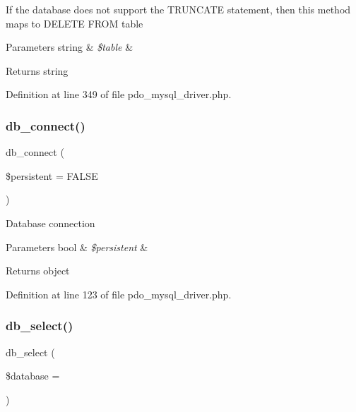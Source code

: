If the database does not support the T\+R\+U\+N\+C\+A\+TE statement, then this method maps to \textquotesingle{}D\+E\+L\+E\+TE F\+R\+OM table\textquotesingle{}


\begin{DoxyParams}[1]{Parameters}
string & {\em \$table} & \\
\hline
\end{DoxyParams}
\begin{DoxyReturn}{Returns}
string 
\end{DoxyReturn}


Definition at line 349 of file pdo\+\_\+mysql\+\_\+driver.\+php.

\mbox{\label{class_c_i___d_b__pdo__mysql__driver_a52bf595e79e96cc0a7c907a9b45aeb4d}} 
\subsubsection{\texorpdfstring{db\_connect()}{db\_connect()}}
{\footnotesize\ttfamily db\+\_\+connect (\begin{DoxyParamCaption}\item[{}]{\$persistent = {\ttfamily FALSE} }\end{DoxyParamCaption})}

Database connection


\begin{DoxyParams}[1]{Parameters}
bool & {\em \$persistent} & \\
\hline
\end{DoxyParams}
\begin{DoxyReturn}{Returns}
object 
\end{DoxyReturn}


Definition at line 123 of file pdo\+\_\+mysql\+\_\+driver.\+php.

\mbox{\label{class_c_i___d_b__pdo__mysql__driver_a18ae9c21870b30b45337c5e3626190cc}} 
\subsubsection{\texorpdfstring{db\_select()}{db\_select()}}
{\footnotesize\ttfamily db\+\_\+select (\begin{DoxyParamCaption}\item[{}]{\$database = {\ttfamily \textquotesingle{}\textquotesingle{}} }\end{DoxyParamCaption})}

